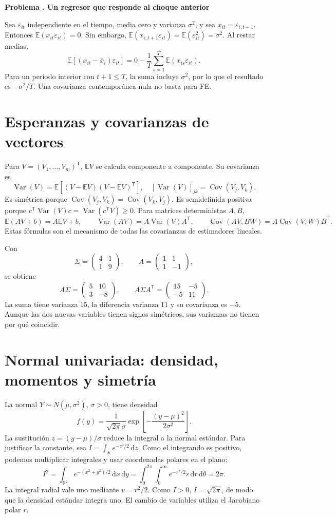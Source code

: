 \documentclass[11pt,a4paper]{article}
\newcommand{\E}{\mathbb E}
\newcommand{\dd}{\,\mathrm d}
\newcommand{\T}{^{\mathsf T}}
\DeclareMathOperator{\Var}{Var}
\DeclareMathOperator{\Cov}{Cov}
\theoremstyle{definition}
\newcounter{problema}
\newenvironment{resuelto}[1]{\refstepcounter{problema}\par\medskip\Needspace{6\baselineskip}\textbf{Problema \theproblema. #1}\par}{\par\medskip}
\newcommand{\eps}{\varepsilon}
\begin{document}
\begin{resuelto}{Un regresor que responde al choque anterior}
Sea $\eps_{it}$ independiente en el tiempo, media cero y varianza $\sigma^2$, y sea
$x_{it}=\eps_{i,t-1}$. Entonces $\E(x_{it}\eps_{it})=0$.
Sin embargo,
$\E(x_{i,t+1}\eps_{it})=\E(\eps_{it}^2)=\sigma^2$.
Al restar medias,
\[
\E[(x_{it}-\bar x_i)\eps_{it}]
=0-\frac1T\sum_{s=1}^T\E(x_{is}\eps_{it}).
\]
Para un período interior con $t+1\le T$, la suma incluye $\sigma^2$, por lo que el resultado es $-\sigma^2/T$. Una covarianza contemporánea nula no basta para FE.
\end{resuelto}

\section{Esperanzas y covarianzas de vectores}
Para $V=(V_1,\ldots,V_m)\T$, $\E V$ se calcula componente a componente. Su covarianza es
\[
\Var(V)=\E[(V-\E V)(V-\E V)\T],
\quad [\Var(V)]_{jk}=\Cov(V_j,V_k).
\]
Es simétrica porque $\Cov(V_j,V_k)=\Cov(V_k,V_j)$. Es semidefinida positiva porque
$c\T\Var(V)c=\Var(c\T V)\ge0$.
Para matrices deterministas $A,B$,
\[
\E(AV+b)=A\E V+b,\qquad
\Var(AV)=A\Var(V)A\T,\qquad
\Cov(AV,BW)=A\Cov(V,W)B\T.
\]
Estas fórmulas son el mecanismo de todas las covarianzas de estimadores lineales.

Con
\[
\Sigma=\begin{pmatrix}4&1\\1&9\end{pmatrix},
\qquad A=\begin{pmatrix}1&1\\1&-1\end{pmatrix},
\]
se obtiene
\[
A\Sigma=\begin{pmatrix}5&10\\3&-8\end{pmatrix},
\qquad
A\Sigma A\T=\begin{pmatrix}15&-5\\-5&11\end{pmatrix}.
\]
La suma tiene varianza $15$, la diferencia varianza $11$ y su covarianza es $-5$. Aunque las dos nuevas variables tienen signos simétricos, sus varianzas no tienen por qué coincidir.

\section{Normal univariada: densidad, momentos y simetría}
La normal $Y\sim N(\mu,\sigma^2)$, $\sigma>0$, tiene densidad
\[
f(y)=\frac1{\sqrt{2\pi}\sigma}
\exp\left[-\frac{(y-\mu)^2}{2\sigma^2}\right].
\]
La sustitución $z=(y-\mu)/\sigma$ reduce la integral a la normal estándar.
Para justificar la constante, sea $I=\int_\mathbb R e^{-z^2/2}\dd z$. Como el integrando es positivo, podemos multiplicar integrales y usar coordenadas polares en el plano:
\[
I^2=\int_{\mathbb R^2}e^{-(x^2+y^2)/2}\dd x\dd y
=\int_0^{2\pi}\int_0^\infty e^{-r^2/2}r\dd r\dd\theta=2\pi.
\]
La integral radial vale uno mediante $v=r^2/2$. Como $I>0$, $I=\sqrt{2\pi}$, de modo que la densidad estándar integra uno. El cambio de variables utiliza el Jacobiano polar $r$.
\end{document}
